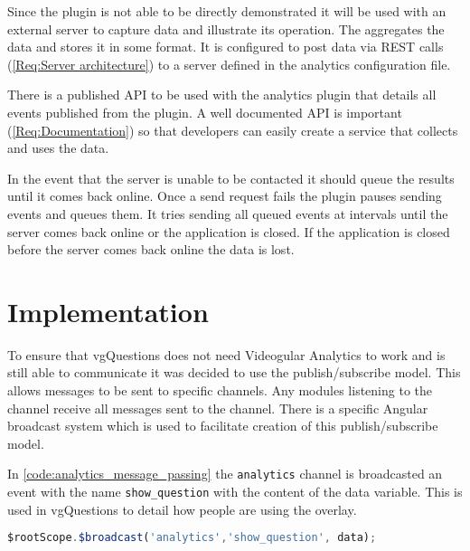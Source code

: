 Since the plugin is not able to be directly demonstrated it will be used with an external server to capture data and illustrate its operation. The aggregates the data and stores it in some format. It is configured to post data via \gls{REST} calls (\cref{Req:Server architecture}) to a server defined in the analytics configuration file.

There is a published \gls{API} to be used with the analytics plugin that details all events published from the plugin. A well documented \gls{API} is important (\cref{Req:Documentation}) so that developers can easily create a service that collects and uses the data.

In the event that the server is unable to be contacted it should queue the results until it comes back online. Once a send request fails the plugin pauses sending events and queues them. It tries sending all queued events at intervals until the server comes back online or the application is closed. If the application is closed before the server comes back online the data is lost.

\section{Implementation}

To ensure that \gls{vgQuestions} does not need \gls{Videogular} Analytics to work and is still able to communicate it was decided to use the publish/subscribe model. This allows messages to be sent to specific channels. Any modules listening to the channel receive all messages sent to the channel. There is a specific Angular broadcast system which is used to facilitate creation of this publish/subscribe model.

In \autoref{code:analytics_message_passing} the \lstinline|analytics| channel is broadcasted an event with the name
\lstinline|show_question| with the content of the data variable. This is used in \gls{vgQuestions} to detail how people are using the overlay.

\begin{lstlisting}[language=javascript,caption={AngularJS demonstrating the message passing interface used in the Analytics plugin},label={code:analytics_message_passing}]
$rootScope.$broadcast('analytics','show_question', data);
\end{lstlisting}

